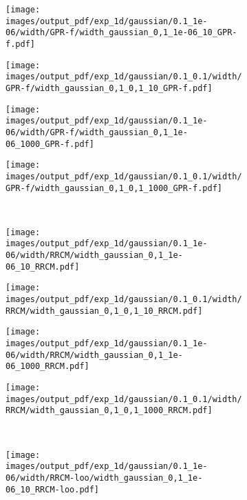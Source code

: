 \documentclass[a4paper,14pt]{extarticle}
\begin{document}
\begin{figure}%
  \centering
  \begin{subfigure}[b]{0.25\linewidth}
    \texttt{[image: images/output\_pdf/exp\_1d/gaussian/0.1\_1e-06/width/GPR-f/width\_gaussian\_0,1\_1e-06\_10\_GPR-f.pdf]}
  \end{subfigure}%
  \begin{subfigure}[b]{0.25\linewidth}
    \texttt{[image: images/output\_pdf/exp\_1d/gaussian/0.1\_0.1/width/GPR-f/width\_gaussian\_0,1\_0,1\_10\_GPR-f.pdf]}
  \end{subfigure}%
  \begin{subfigure}[b]{0.25\linewidth}
    \texttt{[image: images/output\_pdf/exp\_1d/gaussian/0.1\_1e-06/width/GPR-f/width\_gaussian\_0,1\_1e-06\_1000\_GPR-f.pdf]}
  \end{subfigure}%
  \begin{subfigure}[b]{0.25\linewidth}
    \texttt{[image: images/output\_pdf/exp\_1d/gaussian/0.1\_0.1/width/GPR-f/width\_gaussian\_0,1\_0,1\_1000\_GPR-f.pdf]}
  \end{subfigure}\\
  \begin{subfigure}[b]{0.25\linewidth}
    \texttt{[image: images/output\_pdf/exp\_1d/gaussian/0.1\_1e-06/width/RRCM/width\_gaussian\_0,1\_1e-06\_10\_RRCM.pdf]}
  \end{subfigure}%
  \begin{subfigure}[b]{0.25\linewidth}
    \texttt{[image: images/output\_pdf/exp\_1d/gaussian/0.1\_0.1/width/RRCM/width\_gaussian\_0,1\_0,1\_10\_RRCM.pdf]}
  \end{subfigure}%
  \begin{subfigure}[b]{0.25\linewidth}
    \texttt{[image: images/output\_pdf/exp\_1d/gaussian/0.1\_1e-06/width/RRCM/width\_gaussian\_0,1\_1e-06\_1000\_RRCM.pdf]}
  \end{subfigure}%
  \begin{subfigure}[b]{0.25\linewidth}
    \texttt{[image: images/output\_pdf/exp\_1d/gaussian/0.1\_0.1/width/RRCM/width\_gaussian\_0,1\_0,1\_1000\_RRCM.pdf]}
  \end{subfigure}\\
  \begin{subfigure}[b]{0.25\linewidth}
    \texttt{[image: images/output\_pdf/exp\_1d/gaussian/0.1\_1e-06/width/RRCM-loo/width\_gaussian\_0,1\_1e-06\_10\_RRCM-loo.pdf]}
  \end{subfigure}%

\end{figure}
\end{document}
